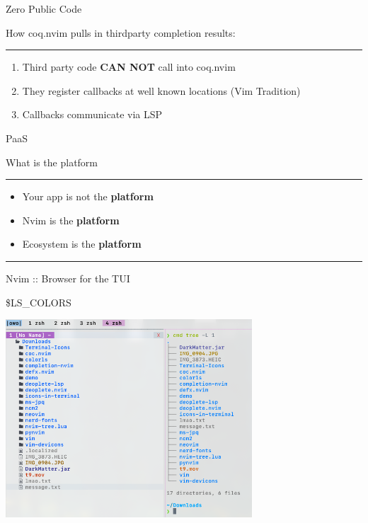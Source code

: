 \documentclass{beamer}
\begin{document}
\begin{frame}{Zero Public Code}

	How coq.nvim pulls in thirdparty completion results:

	\rule{\textwidth}{0.1em}

	\begin{enumerate}

		\item Third party code \textbf{CAN NOT} call into coq.nvim

		\item They register callbacks at well known locations (Vim Tradition)

		\item Callbacks communicate via LSP

	\end{enumerate}

\end{frame}


\begin{frame}{PaaS}

	What is the platform

	\rule{\textwidth}{0.1em}

	\begin{itemize}

		\item Your app is not the \textbf{platform}

		\item Nvim is the \textbf{platform}

		\item Ecosystem is the \textbf{platform}

	\end{itemize}

	\rule{\textwidth}{0.1em}

	Nvim :: Browser for the TUI

\end{frame}


\begin{frame}{\$LS\_COLORS}

	\includegraphics[width=\textwidth,height=20em]{chadtree_ls}

\end{frame}
\end{document}
